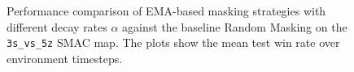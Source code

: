\begin{figure}[H]
\centering
{}%
\hfill%
%
\caption{Performance comparison of EMA-based masking strategies with different decay rates $\alpha$ against the baseline Random Masking on the \texttt{3s\_vs\_5z} SMAC map. The plots show the mean test win rate over environment timesteps.}
\label{fig:ema_comparison}
\end{figure}
